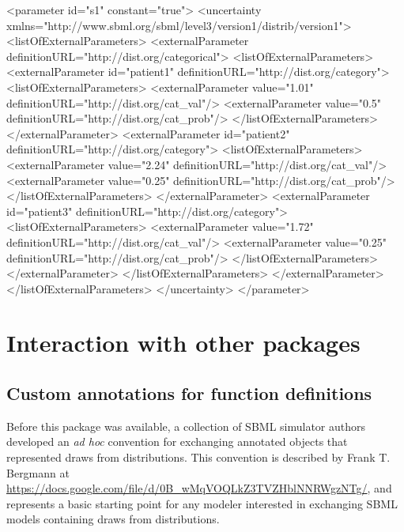 \documentclass[draftspec]{sbmlpkgspec}
\begin{document}
\begin{blockChanged}
\begin{example}
<parameter id="s1" constant="true">
  <uncertainty xmlns="http://www.sbml.org/sbml/level3/version1/distrib/version1">
    <listOfExternalParameters>
      <externalParameter definitionURL="http://dist.org/categorical">
        <listOfExternalParameters>
          <externalParameter id="patient1" definitionURL="http://dist.org/category">
            <listOfExternalParameters>
              <externalParameter value="1.01" definitionURL="http://dist.org/cat_val"/>
              <externalParameter value="0.5" definitionURL="http://dist.org/cat_prob"/>
            </listOfExternalParameters>
          </externalParameter>
          <externalParameter id="patient2" definitionURL="http://dist.org/category">
            <listOfExternalParameters>
              <externalParameter value="2.24" definitionURL="http://dist.org/cat_val"/>
              <externalParameter value="0.25" definitionURL="http://dist.org/cat_prob"/>
            </listOfExternalParameters>
          </externalParameter>
          <externalParameter id="patient3" definitionURL="http://dist.org/category">
            <listOfExternalParameters>
              <externalParameter value="1.72" definitionURL="http://dist.org/cat_val"/>
              <externalParameter value="0.25" definitionURL="http://dist.org/cat_prob"/>
            </listOfExternalParameters>
          </externalParameter>
        </listOfExternalParameters>
      </externalParameter>
    </listOfExternalParameters>
  </uncertainty>
</parameter>
\end{example}

\end{blockChanged}


\section{Interaction with other packages}

\subsection{Custom annotations for function definitions}
\label{sec:annotation-scheme}
Before this package was available, a collection of SBML simulator authors developed an \emph{ad hoc} convention for exchanging annotated \FunctionDefinition objects that represented draws from distributions.  This convention is described by Frank T. Bergmann at \url{https://docs.google.com/file/d/0B_wMqVOQLkZ3TVZHblNNRWgzNTg/}, and represents a basic starting point for any modeler interested in exchanging SBML models containing draws from distributions.
\end{document}
